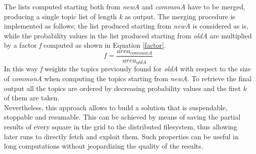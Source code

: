 \documentclass{sig-alternate-05-2015}
\begin{document}
The lists computed starting both from \emph{newA} and \emph{commonA} have to be merged, producing a single topic list of length \emph{k} as output. The merging procedure is implemented as follows; the list produced starting from \emph{newA} is considered as is, while the probability values in the list produced starting from \emph{oldA} are multiplied by a factor \emph{f} computed as shown in Equation \ref{factor}.
\begin{equation}\label{factor}
    f = \frac{area_{commonA}}{area_{oldA}}
\end{equation}
In this way \emph{f} weights the topics previously found for \emph{oldA} with respect to the size of \emph{commonA} when computing the topics starting from \emph{newA}. To retrieve the final output all the topics are ordered by decreasing probability values and  the first \emph{k} of them are taken.\\
Nevertheless, this approach allows to build a solution that is suspendable, stoppable and resumable. This can be achieved by means of saving the partial results of every square in the grid to the distributed filesystem, thus allowing later runs to directly fetch and exploit them. Such properties can be useful in long computations without jeopardizing the quality of the results.
\end{document}
